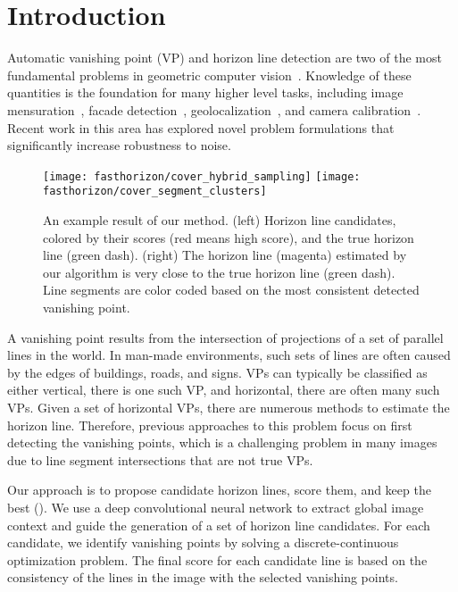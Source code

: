 \section{Introduction}

Automatic vanishing point (VP) and horizon line detection are two of
the most fundamental problems in geometric computer
vision~\cite{barnard1983interpreting,magee1984determining}. Knowledge
of these quantities is the foundation for many higher level
tasks, including image mensuration~\cite{criminisi2000single},
facade detection~\cite{liulocal2014},
geolocalization~\cite{baatz2010handling,workman2014rainbow}, and
camera
calibration~\cite{autorecovery2000,grammatikopoulos2007automatic,
jacobs13cloudcalibration,videocampass2002}. Recent work in this area
\cite{global2013,wildenauer2012,kitware2013} has explored novel
problem formulations that significantly increase robustness to noise.

\begin{figure}
  \centering
  \texttt{[image: fasthorizon/cover\_hybrid\_sampling]}
  \hfill
  \texttt{[image: fasthorizon/cover\_segment\_clusters]}

  \caption{An example result of our method. (left) Horizon line
    candidates, colored by their scores (red means high score), and
    the true horizon line (green dash). (right) The horizon line
    (magenta) estimated by our algorithm is very close to the true
    horizon line (green dash).  Line segments are color coded based on
    the most consistent detected vanishing point.}

  \label{fig:cover}
\end{figure}

A vanishing point results from the intersection of projections of a
set of parallel lines in the world. In man-made environments, such
sets of lines are often caused by the edges of buildings, roads, and
signs. VPs can typically be classified as either vertical, there is
one such VP, and horizontal, there are often many such VPs.  Given a
set of horizontal VPs, there are numerous methods to estimate the
horizon line.  Therefore, previous approaches to this problem focus on
first detecting the vanishing points, which is a challenging problem
in many images due to line segment intersections that are not true
VPs.

Our approach is to propose candidate horizon lines, score them, and
keep the best (). We use a deep convolutional neural network to extract
global image context and guide the generation of a set of horizon line
candidates. For each candidate, we identify vanishing points by
solving a discrete-continuous optimization problem.  The final score for
each candidate line is based on the consistency of the lines in the
image with the selected vanishing points. 

